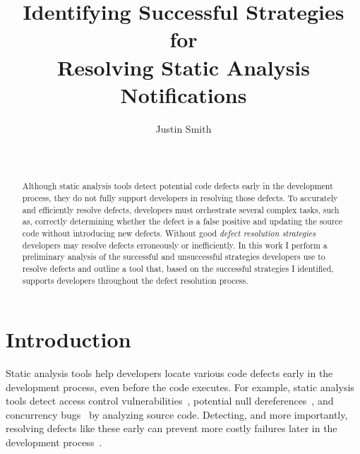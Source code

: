 \documentclass{sig-alternate}
\begin{document}
\toappear{}
\title{Identifying Successful Strategies for \\ Resolving Static Analysis Notifications}

\author{
\alignauthor Justin Smith\\
\\
 \\
}

\maketitle


\begin{abstract}
Although static analysis tools detect potential code defects early in the development process, they do not fully support developers in resolving those defects.
To accurately and efficiently resolve defects, developers must orchestrate several complex tasks, such as, correctly determining whether the defect is a false positive and updating the source code without introducing new defects.
Without good \textit{defect resolution strategies} developers may resolve defects erroneously or inefficiently.
In this work I perform a preliminary analysis of the successful and unsuccessful strategies developers use to resolve defects and outline a tool that, based on the successful strategies I identified, supports developers throughout the defect resolution process. 
\end{abstract}


\section{Introduction}
\label{sec:intro}
Static analysis tools help developers locate various code defects early in the development process, even before the code executes. 
For example, static analysis tools detect access control vulnerabilities~\cite{Aside}, potential null dereferences~\cite{FindBugs}, and concurrency bugs~\cite{ThreadSafe} by analyzing source code.
Detecting, and more importantly, resolving defects like these early can prevent more costly failures later in the development process~\cite{ayewah2008using}.
\end{document}
